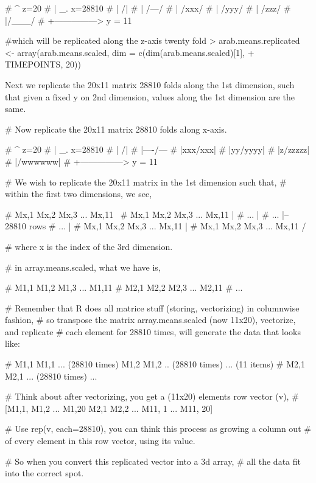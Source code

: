 \documentclass{article}
\begin{document}
\begin{enumerate}[(a)]
\begin{Schunk}
\begin{Sinput}
#  ^ z=20
#  |     _. x=28810
#  |     /|
#  |    /---/
#  |   /xxx/
#  |  /yyy/
#  | /zzz/
#  |/___/
#  +---------------> y = 11

#which will be replicated along the z-axis twenty fold
> arab.means.replicated <- array(arab.means.scaled, dim = c(dim(arab.means.scaled)[1], 
+     TIMEPOINTS, 20))
\end{Sinput}
\end{Schunk}
    
    Next we replicate the 20x11 matrix 28810 folds along the 1st dimension, such that given a fixed y on 2nd dimension, values along the 1st dimension are the same. 
\begin{Schunk}
\begin{Sinput}
# Now replicate the 20x11 matrix 28810 folds along x-axis.

#  ^ z=20
#  |     _. x=28810
#  |     /|
#  |----/---
#  |xxx/xxx|
#  |yy/yyyy|
#  |z/zzzzz|
#  |/wwwwww|
#  +---------------> y = 11

# We wish to replicate the 20x11 matrix in the 1st dimension such that, 
# within the first two dimensions, we see,

# Mx,1 Mx,2 Mx,3 ... Mx,11  \
# Mx,1 Mx,2 Mx,3 ... Mx,11   | 
#           ...              |
#           ...              |-- 28810 rows
#           ...              | 
# Mx,1 Mx,2 Mx,3 ... Mx,11   |
# Mx,1 Mx,2 Mx,3 ... Mx,11  /

# where x is the index of the 3rd dimension.

# in array.means.scaled, what we have is,

# M1,1 M1,2 M1,3 ... M1,11
# M2,1 M2,2 M2,3 ... M2,11
#         ...

# Remember that R does all matrice stuff (storing, vectorizing) in columnwise fashion,
# so transpose the matrix array.means.scaled (now 11x20), vectorize, and replicate 
# each element for 28810 times, will generate the data that looks like:

# M1,1 M1,1 ... (28810 times) M1,2 M1,2 .. (28810 times) ... (11 items) 
# M2,1 M2,1 ... (28810 times) ...

# Think about after vectorizing, you get a (11x20) elements row vector (v),
# [M1,1, M1,2 ... M1,20 M2,1 M2,2 ... M11, 1 ... M11, 20]

# Use rep(v, each=28810), you can think this process as growing a column out
# of every element in this row vector, using its value.

# So when you convert this replicated vector into a 3d array, 
# all the data fit into the correct spot.


\end{Sinput}
\end{Schunk}
\end{enumerate}
\end{document}
